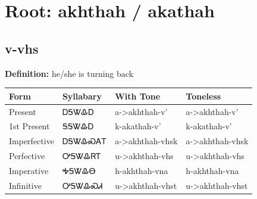 \documentclass{article}%
\begin{document}
%
\normalsize%
\section*{Root: akhthah / akathah}%
\subsection*{v-vhs}%
\textbf{Definition: }%
he/she is turning back%
\\[0.5em]%
\begin{tabular}{|l|l|l|l|}%
\hline%
\textbf{Form}&\textbf{Syllabary}&\textbf{With Tone}&\textbf{Toneless}\\%
\hline%
Present&ᎠᎦᏔᎲᎠ&a{-}>akhthah{-}v'&a{-}>akhthah{-}v'\\%
1st Present&ᎦᎦᏔᎲᎠ&k{-}akathah{-}v'&k{-}akathah{-}v'\\%
Imperfective&ᎠᎦᏔᎲᏍᎪᎢ&a{-}>akhthah{-}vhsk&a{-}>akhthah{-}vhsk\\%
Perfective&ᎤᎦᏔᎲᏒᎢ&u{-}>akhthah{-}vhs&u{-}>akhthah{-}vhs\\%
Imperative&ᎭᎦᏔᎲᎾ&h{-}akhthah{-}vna&h{-}akhthah{-}vna\\%
Infinitive&ᎤᎦᏔᎲᏍᏗ&u{-}>akhthah{-}vhst&u{-}>akhthah{-}vhst\\%
\hline%
\end{tabular}%
\\[1em]%
\end{document}
